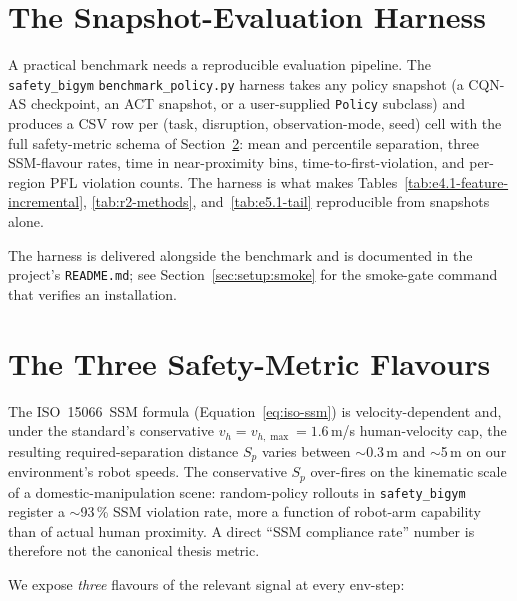 \documentclass[11pt,a4paper]{report}
\newcommand{\ssm}{SSM}
\newcommand{\pfl}{PFL}
\newcommand{\iso}{ISO~15066}
\newcommand{\sbigym}{\texttt{safety\_bigym}}
\newcommand{\cqnas}{CQN-AS}
\begin{document}
\section{The Snapshot-Evaluation Harness}
\label{sec:bench:harness}

A practical benchmark needs a reproducible evaluation pipeline. The
\sbigym{} \texttt{benchmark\_policy.py} harness takes any policy
snapshot (a \cqnas{} checkpoint, an ACT snapshot, or a user-supplied
\texttt{Policy} subclass) and produces a CSV row per (task,
disruption, observation-mode, seed) cell with the full safety-metric
schema of Section~\ref{sec:bench:metrics:flavours}: mean and
percentile separation, three SSM-flavour rates, time in
near-proximity bins, time-to-first-violation, and per-region
\pfl{} violation counts. The harness is what makes
Tables~\ref{tab:e4.1-feature-incremental}, \ref{tab:r2-methods},
and~\ref{tab:e5.1-tail} reproducible from snapshots alone.

The harness is delivered alongside the benchmark and is documented
in the project's \texttt{README.md}; see
Section~\ref{sec:setup:smoke} for the smoke-gate command that
verifies an installation.



\section{The Three Safety-Metric Flavours}
\label{sec:bench:metrics:flavours}

The \iso{}~\ssm{} formula (Equation~\ref{eq:iso-ssm}) is
velocity-dependent and, under the standard's conservative
$v_h = v_{h,\max} = 1.6$\,m/s human-velocity cap, the resulting
required-separation distance $S_p$ varies between $\sim$0.3\,m and
$\sim$5\,m on our environment's robot speeds. The conservative
$S_p$ over-fires on the kinematic scale of a domestic-manipulation
scene: random-policy rollouts in \sbigym{} register a $\sim$93\,\%
\ssm{} violation rate, more a function of robot-arm capability than
of actual human proximity. A direct ``\ssm{} compliance rate''
number is therefore not the canonical thesis metric.

We expose \emph{three} flavours of the relevant signal at every
env-step:
\end{document}
